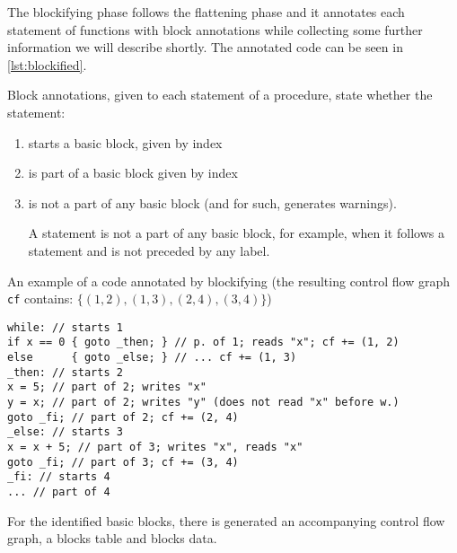 The blockifying phase follows the flattening phase and it annotates each statement of functions with block annotations while collecting some further information we will describe shortly. The annotated code can be seen in \cref{lst:blockified}.

\begin{defn}
    Block annotations, given to each statement of a procedure, state whether the statement:

    \begin{enumerate}
        \item starts a basic block, given by index
        \item is part of a basic block given by index
        \item is not a part of any basic block (and for such, generates warnings).

        A statement is not a part of any basic block, for example, when it follows a  statement and is not preceded by any label.
    \end{enumerate}
\end{defn}

\begin{codex}
    \caption{An example of a code annotated by blockifying (the resulting control flow graph \texttt{cf} contains: $\{(1,2), (1,3), (2,4), (3,4)\}$)}
    \label{lst:blockified}
    \begin{lstlisting}
while: // starts 1
if x == 0 { goto _then; } // p. of 1; reads "x"; cf += (1, 2)
else      { goto _else; } // ... cf += (1, 3)
_then: // starts 2
x = 5; // part of 2; writes "x"
y = x; // part of 2; writes "y" (does not read "x" before w.)
goto _fi; // part of 2; cf += (2, 4)
_else: // starts 3
x = x + 5; // part of 3; writes "x", reads "x"
goto _fi; // part of 3; cf += (3, 4)
_fi: // starts 4
... // part of 4
    \end{lstlisting}
\end{codex}

For the identified basic blocks, there is generated an accompanying control flow graph, a blocks table and blocks data.

